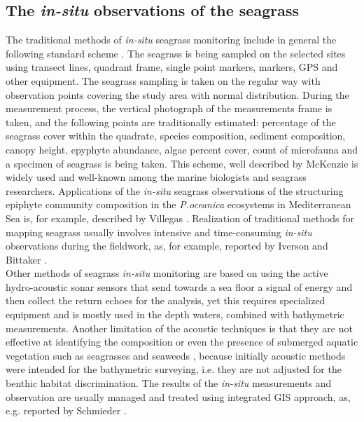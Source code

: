 \documentclass[11pt]{article}
\begin{document}
\subsection[\textit{In-situ} observations of the seagrass]{The \textit{in-situ} observations of the seagrass}
The traditional methods of \textit{in-situ} seagrass monitoring include in general the following standard
scheme \cite{McKenzieetal03} \label{McKenzieetal03}. The seagrass is being sampled on the selected sites using transect lines,
quadrant frame, single point markers, markers, \ac{GPS} and other equipment. The seagrass sampling is
taken on the regular way with observation points covering the study area with normal distribution.
During the measurement process, the vertical photograph of the measurements frame is taken, and the
following points are traditionally estimated: percentage of the seagrass cover within the quadrate,
species composition, sediment composition, canopy height, epyphyte abundance, algae percent cover,
count of microfauna and a specimen of seagrass is being taken. This scheme, well described by
McKenzie \cite{McKenzieetal03}\label{McKenzieetal03} is widely used and well-known among the marine biologists and
seagrass researchers. Applications of the \textit{in-situ} seagrass observations of the structuring epiphyte
community composition in the \textit{P.oceanica} ecosystems in Mediterranean Sea is, for example,
described by Villegas \cite{Villegas06}\label{Villegas06}. Realization of traditional methods for mapping seagrass usually
involves intensive and time-consuming \textit{in-situ} observations during the fieldwork, as, for example,
reported by Iverson and Bittaker \cite{Iverson86}\label{Iverson86}. \\
Other methods of seagrass \textit{in-situ} monitoring are based on
using the active hydro-acoustic sonar sensors that send towards a sea floor a signal of energy and then
collect the return echoes for the analysis, yet this requires specialized equipment and is mostly used in
the depth waters, combined with bathymetric measurements. Another limitation of the acoustic
techniques is that they are not effective at identifying the composition or even the presence of
submerged aquatic vegetation such as seagrasses and seaweeds \cite{Werdell03}\label{Werdell03}, because
initially acoustic methods were intended for the bathymetric surveying, i.e. they are not adjusted for
the benthic habitat discrimination. The results of the \textit{in-situ} measurements and observation are usually
managed and treated using integrated \ac{GIS} approach, as, e.g. reported by Schmieder \cite{Schmieder97}\label{Schmieder97}.
\end{document}
